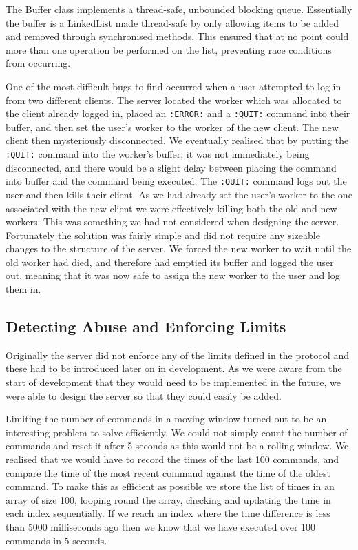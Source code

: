 The Buffer class implements a thread-safe, unbounded blocking queue. Essentially the buffer is a LinkedList made thread-safe by only allowing items to be added and removed through synchronised methods. This ensured that at no point could more than one operation be performed on the list, preventing race conditions from occurring.

One of the most difficult bugs to find occurred when a user attempted to log in from two different clients. The server located the worker which was allocated to the client already logged in, placed an \texttt{:ERROR:} and a \texttt{:QUIT:} command into their buffer, and then set the user's worker to the worker of the new client. The new client then mysteriously disconnected. We eventually realised that by putting the \texttt{:QUIT:} command into the worker's buffer, it was not immediately being disconnected, and there would be a slight delay between placing the command into buffer and the command being executed. The \texttt{:QUIT:} command logs out the user and then kills their client. As we had already set the user's worker to the one associated with the new client we were effectively killing both the old and new workers. This was something we had not considered when designing the server. Fortunately the solution was fairly simple and did not require any sizeable changes to the structure of the server. We forced the new worker to wait until the old worker had died, and therefore had emptied its buffer and logged the user out, meaning that it was now safe to assign the new worker to the user and log them in.

\subsection{Detecting Abuse and Enforcing Limits}
Originally the server did not enforce any of the limits defined in the protocol and these had to be introduced later on in development. As we were aware from the start of development that they would need to be implemented in the future, we were able to design the server so that they could easily be added. 

Limiting the number of commands in a moving window turned out to be an interesting problem to solve efficiently. We could not simply count the number of commands and reset it after 5 seconds as this would not be a rolling window. We realised that we would have to record the times of the last 100 commands, and compare the time of the most recent command against the time of the oldest command. To make this as efficient as possible we store the list of times in an array of size 100, looping round the array, checking and updating the time in each index sequentially. If we reach an index where the time difference is less than 5000 milliseconds ago then we know that we have executed over 100 commands in 5 seconds.

